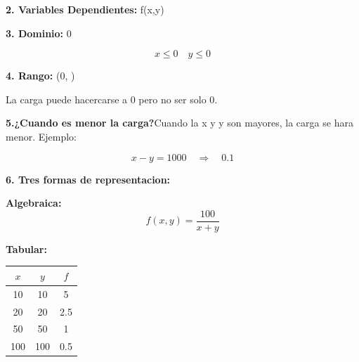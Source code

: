 \documentclass[12pt]{article}
\begin{document}
\begin{justify}
\begin{justify}
\begin{justify}
{\textbf{2. Variables Dependientes:}} {\small f(x,y)}
\vspace{0.01cm}
\end{justify}

\begin{justify}
{\textbf{3. Dominio:}} {\small 0}
\vspace{0.01cm}
\end{justify}

\begin{center}
\[x\leq 0 \quad y\leq 0\]
\end{center}

\begin{justify}
{\textbf{4. Rango:}} \small(0, \infty ) \quad 
\vspace{0.01cm}
\end{justify}

\begin{justify}
    \small La carga puede hacercarse a 0 pero no ser solo 0.
\end{justify}

\begin{justify}
    {\textbf{5.¿Cuando es menor la carga?}}\quad \small Cuando la x y y son mayores, la carga se hara menor. Ejemplo:
    \vspace{0.01cm}
\end{justify}

\begin{center}
    \[ x - y = 1000 \quad \Longrightarrow \quad  0.1\]
\end{center}

\begin{justify}
   {\textbf{6. Tres formas de representacion:}}
   \vspace{0.01cm}
\end{justify}

\begin{justify}
    \small\textbf {Algebraica: } \small
\[f(x,y)=\frac{100}{x+y}\]
\end{justify}

\begin{justify}
\small\textbf {Tabular: }
\begin{tabular}{|c|c|c|}
\hline
\textbf{$x$} & \textbf{$y$} & \textbf{$f$} \\ \hline
10 & 10 & 5 \\ \hline
20 & 20 & 2.5 \\ \hline
50 & 50 & 1 \\ \hline
100 & 100 & 0.5 \\ \hline
\end{tabular}
\end{justify}


\end{justify}
\end{justify}
\end{document}
